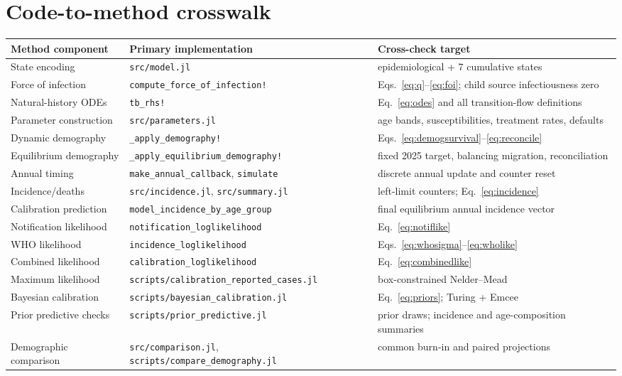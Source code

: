 \documentclass[11pt]{article}
\newcommand{\code}[1]{\texttt{#1}}
\begin{document}
\section{Code-to-method crosswalk}

\begin{longtable}{>{\raggedright\arraybackslash}p{}>{\raggedright\arraybackslash}p{}>{\raggedright\arraybackslash}p{}}
\toprule
Method component & Primary implementation & Cross-check target\\
\midrule
State encoding & \code{src/model.jl} & 10 epidemiological + 7 cumulative states\\
Force of infection & \code{compute\_force\_of\_infection!} & Eqs.~\eqref{eq:q}--\eqref{eq:foi}; child source infectiousness zero\\
Natural-history ODEs & \code{tb\_rhs!} & Eq.~\eqref{eq:odes} and all transition-flow definitions\\
Parameter construction & \code{src/parameters.jl} & age bands, susceptibilities, treatment rates, defaults\\
Dynamic demography & \code{\_apply\_demography!} & Eqs.~\eqref{eq:demogsurvival}--\eqref{eq:reconcile}\\
Equilibrium demography & \code{\_apply\_equilibrium\_demography!} & fixed 2025 target, balancing migration, reconciliation\\
Annual timing & \code{make\_annual\_callback}, \code{simulate} & discrete annual update and counter reset\\
Incidence/deaths & \code{src/incidence.jl}, \code{src/summary.jl} & left-limit counters; Eq.~\eqref{eq:incidence}\\
Calibration prediction & \code{model\_incidence\_by\_age\_group} & final equilibrium annual incidence vector\\
Notification likelihood & \code{notification\_loglikelihood} & Eq.~\eqref{eq:notiflike}\\
WHO likelihood & \code{incidence\_loglikelihood} & Eqs.~\eqref{eq:whosigma}--\eqref{eq:wholike}\\
Combined likelihood & \code{calibration\_loglikelihood} & Eq.~\eqref{eq:combinedlike}\\
Maximum likelihood & \code{scripts/calibration\_reported\_cases.jl} & box-constrained Nelder--Mead\\
Bayesian calibration & \code{scripts/bayesian\_calibration.jl} & Eq.~\eqref{eq:priors}; Turing + Emcee\\
Prior predictive checks & \code{scripts/prior\_predictive.jl} & 500 prior draws; incidence and age-composition summaries\\
Demographic comparison & \code{src/comparison.jl}, \code{scripts/compare\_demography.jl} & common burn-in and paired projections\\
\bottomrule
\end{longtable}
\end{document}
